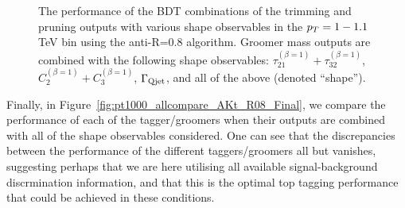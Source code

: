 \begin{figure}
\begin{center}
\caption{The performance of the BDT combinations of the trimming and pruning outputs with various shape observables in the $p_T = 1-1.1$ TeV bin using the anti-\kT R=0.8 algorithm. Groomer mass outputs are combined with the following shape observables: $\tau_{21}^{(\beta=1)}+\tau_{32}^{(\beta=1)}$, $C_{2}^{(\beta=1)}+C_{3}^{(\beta=1)}$, $\Gamma_{\rm Qjet}$, and all of the above (denoted ``shape'').}
\label{fig:pt1000_allcompare_AKt_R08_GroomSh}
\end{center}
\end{figure}

Finally, in Figure~\ref{fig:pt1000_allcompare_AKt_R08_Final}, we compare the performance of each of the tagger/groomers when their outputs are combined with all of the shape observables considered. One can see that the discrepancies between the performance of the different taggers/groomers all but vanishes, suggesting perhaps that we are here utilising all available signal-background discrmination information, and that this is the optimal top tagging performance that could be achieved in these conditions. 

